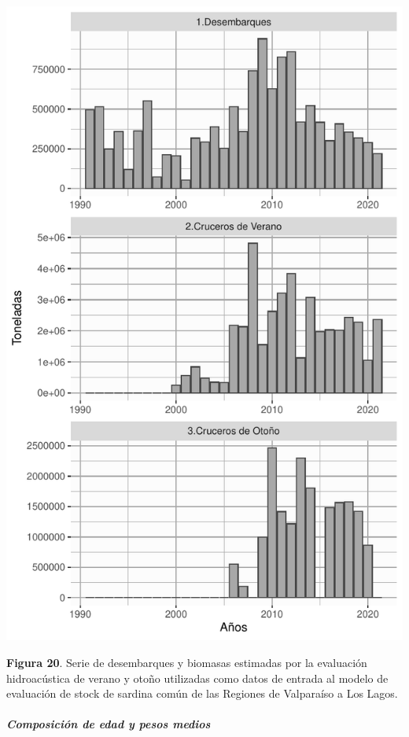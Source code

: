 \documentclass[
  spanish,
]{article}
\begin{document}
\begin{center}\includegraphics{FigurasInforme_Marzo/F20_datInd-1} \end{center}

\vspace{-0.5cm}
\small

\textbf{Figura 20}. Serie de desembarques y biomasas estimadas por la
evaluación hidroacústica de verano y otoño utilizadas como datos de
entrada al modelo de evaluación de stock de sardina común de las
Regiones de Valparaíso a Los Lagos. \vspace{0.5cm} \normalsize

\pagebreak

\hypertarget{composiciuxf3n-de-edad-y-pesos-medios}{%
\subparagraph{Composición de edad y pesos
medios}\label{composiciuxf3n-de-edad-y-pesos-medios}}
\end{document}
